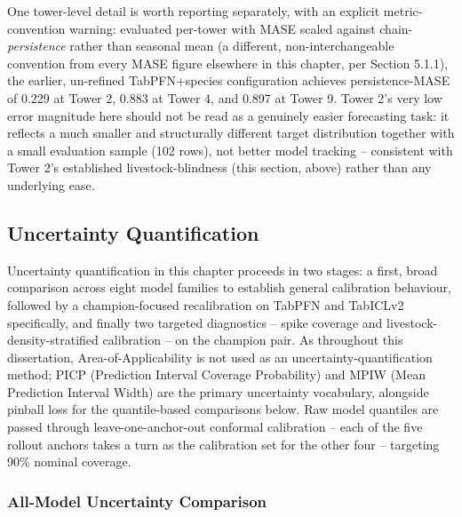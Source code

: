 \FloatBarrier

One tower-level detail is worth reporting separately, with an explicit metric-convention warning:
evaluated per-tower with MASE scaled against chain-\emph{persistence} rather than seasonal mean (a
different, non-interchangeable convention from every MASE figure elsewhere in this chapter, per
Section 5.1.1), the earlier, un-refined TabPFN+species configuration achieves persistence-MASE of
0.229 at Tower 2, 0.883 at Tower 4, and 0.897 at Tower 9. Tower 2's very low error magnitude here
should not be read as a genuinely easier forecasting task: it reflects a much smaller and
structurally different target distribution together with a small evaluation sample (102 rows), not
better model tracking -- consistent with Tower 2's established livestock-blindness (this section,
above) rather than any underlying ease.

\subsection{Uncertainty Quantification}

Uncertainty quantification in this chapter proceeds in two stages: a first, broad comparison across
eight model families to establish general calibration behaviour, followed by a champion-focused
recalibration on TabPFN and TabICLv2 specifically, and finally two targeted diagnostics -- spike
coverage and livestock-density-stratified calibration -- on the champion pair. As throughout this
dissertation, Area-of-Applicability is not used as an uncertainty-quantification method; PICP
(Prediction Interval Coverage Probability) and MPIW (Mean Prediction Interval Width) are the primary
uncertainty vocabulary, alongside pinball loss for the quantile-based comparisons below. Raw model
quantiles are passed through leave-one-anchor-out conformal calibration -- each of the five rollout
anchors takes a turn as the calibration set for the other four -- targeting 90\% nominal coverage.

\subsubsection{All-Model Uncertainty Comparison}

